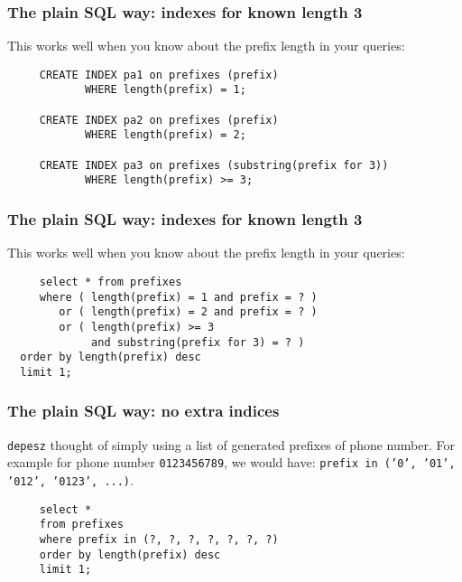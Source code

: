 \documentclass{beamer}
\begin{document}
\begin{frame}[fragile]
  \frametitle{The plain SQL way: indexes for known length 3}

  This works well when you know about the prefix length in your queries:

  \begin{example}
  \begin{verbatim}
     CREATE INDEX pa1 on prefixes (prefix) 
            WHERE length(prefix) = 1;

     CREATE INDEX pa2 on prefixes (prefix)
            WHERE length(prefix) = 2;

     CREATE INDEX pa3 on prefixes (substring(prefix for 3))
            WHERE length(prefix) >= 3;
  \end{verbatim}
  \end{example}
\end{frame}


\begin{frame}[fragile]
  \frametitle{The plain SQL way: indexes for known length 3}

  This works well when you know about the prefix length in your queries:

  \begin{example}
  \begin{verbatim}
     select * from prefixes
     where ( length(prefix) = 1 and prefix = ? )
        or ( length(prefix) = 2 and prefix = ? )
        or ( length(prefix) >= 3 
             and substring(prefix for 3) = ? )
  order by length(prefix) desc
  limit 1;
  \end{verbatim}
  \end{example}
\end{frame}

\begin{frame}[fragile]
  \frametitle{The plain SQL way: no extra indices}

   \texttt{depesz} thought of simply using a list of generated prefixes of
   phone number. For example for phone number \texttt{0123456789}, we would
   have: \texttt{prefix in ('0', '01', '012', '0123', ...)}.

  \begin{example}
  \begin{verbatim}
     select *
     from prefixes
     where prefix in (?, ?, ?, ?, ?, ?, ?)
     order by length(prefix) desc
     limit 1;
  \end{verbatim}
  \end{example}
\end{frame}
\end{document}
